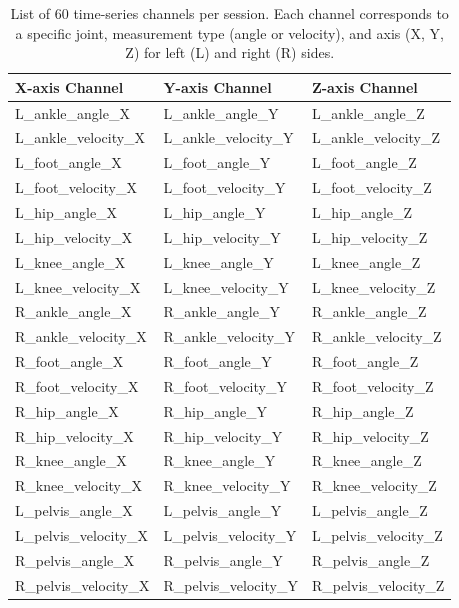 \begin{table}[htbp]
    \centering
    \caption[List of 60 time-series channels]{List of 60 time-series channels per session. Each channel corresponds to a specific joint, measurement type (angle or velocity), and axis (X, Y, Z) for left (L) and right (R) sides. \label{tab:met-ts-vars}}
    \begin{tabular}{lll}
    \hline
    \textbf{X-axis Channel} & \textbf{Y-axis Channel} & \textbf{Z-axis Channel} \\
    \hline
    L\_ankle\_angle\_X      & L\_ankle\_angle\_Y      & L\_ankle\_angle\_Z \\
    L\_ankle\_velocity\_X   & L\_ankle\_velocity\_Y   & L\_ankle\_velocity\_Z \\
    L\_foot\_angle\_X       & L\_foot\_angle\_Y       & L\_foot\_angle\_Z \\
    L\_foot\_velocity\_X    & L\_foot\_velocity\_Y    & L\_foot\_velocity\_Z \\
    L\_hip\_angle\_X        & L\_hip\_angle\_Y        & L\_hip\_angle\_Z \\
    L\_hip\_velocity\_X     & L\_hip\_velocity\_Y     & L\_hip\_velocity\_Z \\
    L\_knee\_angle\_X       & L\_knee\_angle\_Y       & L\_knee\_angle\_Z \\
    L\_knee\_velocity\_X    & L\_knee\_velocity\_Y    & L\_knee\_velocity\_Z \\
    R\_ankle\_angle\_X      & R\_ankle\_angle\_Y      & R\_ankle\_angle\_Z \\
    R\_ankle\_velocity\_X   & R\_ankle\_velocity\_Y   & R\_ankle\_velocity\_Z \\
    R\_foot\_angle\_X       & R\_foot\_angle\_Y       & R\_foot\_angle\_Z \\
    R\_foot\_velocity\_X    & R\_foot\_velocity\_Y    & R\_foot\_velocity\_Z \\
    R\_hip\_angle\_X        & R\_hip\_angle\_Y        & R\_hip\_angle\_Z \\
    R\_hip\_velocity\_X     & R\_hip\_velocity\_Y     & R\_hip\_velocity\_Z \\
    R\_knee\_angle\_X       & R\_knee\_angle\_Y       & R\_knee\_angle\_Z \\
    R\_knee\_velocity\_X    & R\_knee\_velocity\_Y    & R\_knee\_velocity\_Z \\
    L\_pelvis\_angle\_X     & L\_pelvis\_angle\_Y     & L\_pelvis\_angle\_Z \\
    L\_pelvis\_velocity\_X  & L\_pelvis\_velocity\_Y  & L\_pelvis\_velocity\_Z \\
    R\_pelvis\_angle\_X     & R\_pelvis\_angle\_Y     & R\_pelvis\_angle\_Z \\
    R\_pelvis\_velocity\_X  & R\_pelvis\_velocity\_Y  & R\_pelvis\_velocity\_Z \\
    \hline
    \end{tabular}
\end{table}

